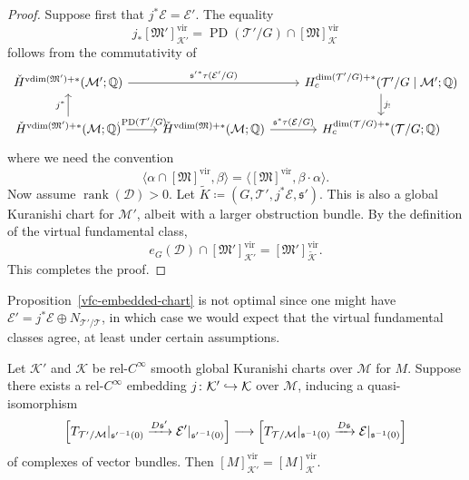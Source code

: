 \documentclass[AHL,Unicode,longabstracts]{cedram}
\newcommand{\inv}{^{-1}}
\newcommand{\inpr}[2]{\langle {#1},{#2} \rangle}
\newcommand{\vfc}[1]{[#1]^{\virt}}
\newcommand{\cl}{\colon}
\newcommand{\chml}{\check{H}}
\newcommand{\dsm}{\oplus}
\newcommand{\wt}{\widetilde}
\newcommand{\bQ}{\mathbb{Q}}
\newcommand{\cD}{\mathcal{D}}
\newcommand{\cE}{\mathcal{E}}
\newcommand{\cK}{\mathcal{K}}
\newcommand{\cM}{\mathcal{M}}
\newcommand{\cT}{\mathcal{T}}
\newcommand{\fM}{\mathfrak{M}}
\newcommand{\fs}{\mathfrak{s}}
\DeclareMathOperator{\virt}{vir}
\DeclareMathOperator{\rank}{rank}
\DeclareMathOperator{\pcd}{PD}
\DeclareMathOperator{\vdim}{vdim}
\newcommand{\xra}{\xrightarrow}
\renewcommand*{\to}{\mathchoice{\longrightarrow}{\rightarrow}{\rightarrow}{\rightarrow}}
\newcommand{\longhookrightarrow}{\lhook\joinrel\longrightarrow}
\newcommand*{\hookto}{\mathchoice{\longhookrightarrow}{\hookrightarrow}{\hookrightarrow}{\hookrightarrow}}
\begin{document}
\begin{proof}
Suppose first that $j^*\cE = \cE'$. The equality
\begin{equation}\label{normal-vfc-same-obstruction}
j_*\vfc{\fM'}_{\cK'} = \pcd(\cT'/G)\cap \vfc{\fM}_\cK
\end{equation}
follows from the commutativity of
\[
\begin{tikzcd}
\chml^{\vdim(\fM')+*}(\cM';\bQ) \arrow[rr,"{\fs'}^*\tau(\cE'/G)"] &&H^{\dim(\cT'/G)+*}_c(\cT'/G\mid\cM';\bQ) \arrow[d,"j_!"]\\
\chml^{\vdim(\fM')+*}(\cM;\bQ)\arrow[u,"j^*"]\arrow[r,"\cdot\pcd(\cT'/G)"] &\chml^{\vdim(\fM)+*}(\cM;\bQ)\arrow[r,"\fs^*\tau(\cE/G)"] &H_c^{\dim(\cT/G)+*}(\cT/G;\bQ)
\end{tikzcd}
\]
where we need the convention
\[
\inpr{\alpha\cap \vfc{\fM}}{\beta} = \inpr{\vfc{\fM}}{\beta\cdot \alpha}.
\]
Now assume $\rank(\cD) > 0$. Let $\wt{K} \coloneqq (G,\cT',j^*\cE,\fs')$. This is also a global Kuranishi chart for $\cM'$, albeit with a larger obstruction bundle. By the definition of the virtual fundamental class,
\[
e_G(\cD)\cap \vfc{\fM'}_{\cK'} = \vfc{\fM'}_{\wt{\cK}}.
\]
This completes the proof.
\end{proof}


Proposition~\ref{vfc-embedded-chart} is not optimal since one might have $\cE' = j^*\cE\dsm N_{\cT'/\cT}$, in which case we would expect that the virtual fundamental classes agree, at least under certain assumptions.

\begin{lemm}\label{quasi-isomorphic-global-charts}
Let $\cK'$ and $\cK$ be rel-$C^\infty$ smooth global Kuranishi charts over $\cM$ for $M$. Suppose there exists a rel-$C^\infty$ embedding $j \cl \cK' \hookto \cK$ over $\cM$, inducing a quasi-isomorphism
\begin{equation}\label{quasi-gkc}
\left[T_{\cT'/\cM}|_{{\fs'}\inv(0)}\xra{D\fs'}\cE'|_{{\fs'}\inv(0)}\right]\to \left[T_{\cT/\cM}|_{{\fs}\inv(0)}\xra{D\fs} \cE|_{{\fs}\inv(0)}\right]
\end{equation}
of complexes of vector bundles. Then $\vfc{M}_{\cK'} = \vfc{M}_\cK$.
\end{lemm}
\end{document}
